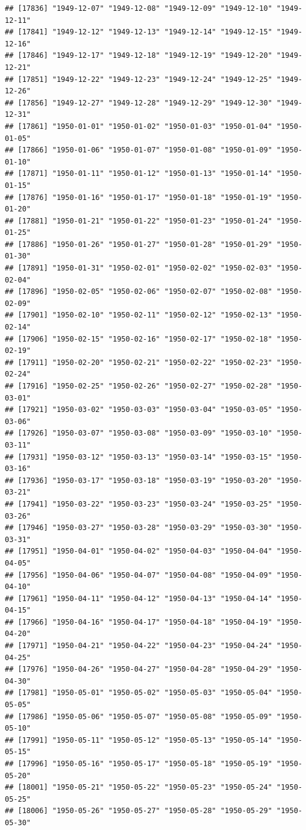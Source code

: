 \documentclass{article}\usepackage[]{graphicx}\usepackage[]{color}
\makeatletter
\newenvironment{kframe}{%
 \def\at@end@of@kframe{}%
 \ifinner\ifhmode%
  \def\at@end@of@kframe{\end{minipage}}%
  \begin{minipage}{\columnwidth}%
 \fi\fi%
 \def\FrameCommand##1{\hskip\@totalleftmargin \hskip-\fboxsep
 \colorbox{shadecolor}{##1}\hskip-\fboxsep
     \hskip-\linewidth \hskip-\@totalleftmargin \hskip\columnwidth}%
 \MakeFramed {\advance\hsize-\width
   \@totalleftmargin\z@ \linewidth\hsize
   \@setminipage}}%
 {\par\unskip\endMakeFramed%
 \at@end@of@kframe}
\newenvironment{knitrout}{}{} %
\makeatother
\begin{document}
\begin{description}
\begin{knitrout}
\begin{kframe}
\begin{verbatim}
## [17836] "1949-12-07" "1949-12-08" "1949-12-09" "1949-12-10" "1949-12-11"
## [17841] "1949-12-12" "1949-12-13" "1949-12-14" "1949-12-15" "1949-12-16"
## [17846] "1949-12-17" "1949-12-18" "1949-12-19" "1949-12-20" "1949-12-21"
## [17851] "1949-12-22" "1949-12-23" "1949-12-24" "1949-12-25" "1949-12-26"
## [17856] "1949-12-27" "1949-12-28" "1949-12-29" "1949-12-30" "1949-12-31"
## [17861] "1950-01-01" "1950-01-02" "1950-01-03" "1950-01-04" "1950-01-05"
## [17866] "1950-01-06" "1950-01-07" "1950-01-08" "1950-01-09" "1950-01-10"
## [17871] "1950-01-11" "1950-01-12" "1950-01-13" "1950-01-14" "1950-01-15"
## [17876] "1950-01-16" "1950-01-17" "1950-01-18" "1950-01-19" "1950-01-20"
## [17881] "1950-01-21" "1950-01-22" "1950-01-23" "1950-01-24" "1950-01-25"
## [17886] "1950-01-26" "1950-01-27" "1950-01-28" "1950-01-29" "1950-01-30"
## [17891] "1950-01-31" "1950-02-01" "1950-02-02" "1950-02-03" "1950-02-04"
## [17896] "1950-02-05" "1950-02-06" "1950-02-07" "1950-02-08" "1950-02-09"
## [17901] "1950-02-10" "1950-02-11" "1950-02-12" "1950-02-13" "1950-02-14"
## [17906] "1950-02-15" "1950-02-16" "1950-02-17" "1950-02-18" "1950-02-19"
## [17911] "1950-02-20" "1950-02-21" "1950-02-22" "1950-02-23" "1950-02-24"
## [17916] "1950-02-25" "1950-02-26" "1950-02-27" "1950-02-28" "1950-03-01"
## [17921] "1950-03-02" "1950-03-03" "1950-03-04" "1950-03-05" "1950-03-06"
## [17926] "1950-03-07" "1950-03-08" "1950-03-09" "1950-03-10" "1950-03-11"
## [17931] "1950-03-12" "1950-03-13" "1950-03-14" "1950-03-15" "1950-03-16"
## [17936] "1950-03-17" "1950-03-18" "1950-03-19" "1950-03-20" "1950-03-21"
## [17941] "1950-03-22" "1950-03-23" "1950-03-24" "1950-03-25" "1950-03-26"
## [17946] "1950-03-27" "1950-03-28" "1950-03-29" "1950-03-30" "1950-03-31"
## [17951] "1950-04-01" "1950-04-02" "1950-04-03" "1950-04-04" "1950-04-05"
## [17956] "1950-04-06" "1950-04-07" "1950-04-08" "1950-04-09" "1950-04-10"
## [17961] "1950-04-11" "1950-04-12" "1950-04-13" "1950-04-14" "1950-04-15"
## [17966] "1950-04-16" "1950-04-17" "1950-04-18" "1950-04-19" "1950-04-20"
## [17971] "1950-04-21" "1950-04-22" "1950-04-23" "1950-04-24" "1950-04-25"
## [17976] "1950-04-26" "1950-04-27" "1950-04-28" "1950-04-29" "1950-04-30"
## [17981] "1950-05-01" "1950-05-02" "1950-05-03" "1950-05-04" "1950-05-05"
## [17986] "1950-05-06" "1950-05-07" "1950-05-08" "1950-05-09" "1950-05-10"
## [17991] "1950-05-11" "1950-05-12" "1950-05-13" "1950-05-14" "1950-05-15"
## [17996] "1950-05-16" "1950-05-17" "1950-05-18" "1950-05-19" "1950-05-20"
## [18001] "1950-05-21" "1950-05-22" "1950-05-23" "1950-05-24" "1950-05-25"
## [18006] "1950-05-26" "1950-05-27" "1950-05-28" "1950-05-29" "1950-05-30"

\end{verbatim}
\end{kframe}
\end{knitrout}
\end{description}
\end{document}
